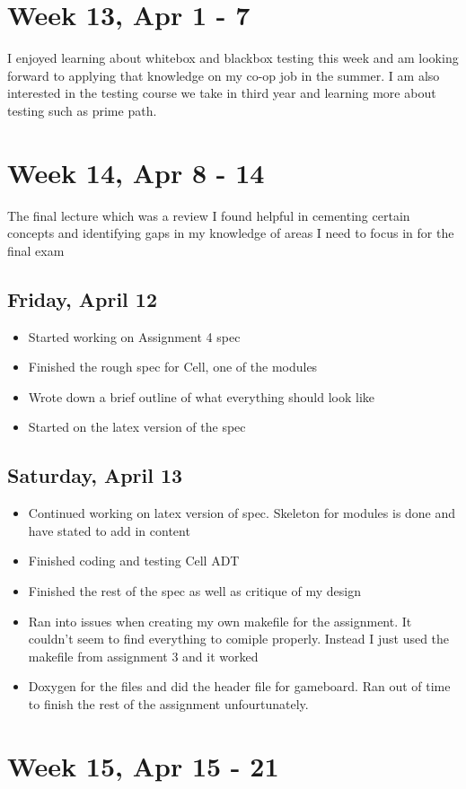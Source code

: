 \documentclass{article}
\begin{document}
\section{Week 13, Apr 1 - 7}

I enjoyed learning about whitebox and blackbox testing this week and am looking forward to applying that knowledge on my co-op job in the summer. I am also interested in the testing course we take in third year and learning more about testing such as prime path.

\section{Week 14, Apr 8 - 14}

The final lecture which was a review I found helpful in cementing certain concepts and identifying gaps in my knowledge of areas I need to focus in for the final exam

\subsection{Friday, April 12}
\begin{itemize}
    \item Started working on Assignment 4 spec
    \item Finished the rough spec for Cell, one of the modules
    \item Wrote down a brief outline of what everything should look like
    \item Started on the latex version of the spec
\end{itemize}

\subsection{Saturday, April 13}
\begin{itemize}
    \item Continued working on latex version of spec. Skeleton for modules is done and have stated to add in content
    \item Finished coding and testing Cell ADT
    \item Finished the rest of the spec as well as critique of my design
    \item Ran into issues when creating my own makefile for the assignment. It couldn't seem to find everything to comiple properly. Instead I just used the makefile from assignment 3 and it worked
    \item Doxygen for the files and did the header file for gameboard. Ran out of time to finish the rest of the assignment unfourtunately.
\end{itemize}

\section{Week 15, Apr 15 - 21}
\end{document}
